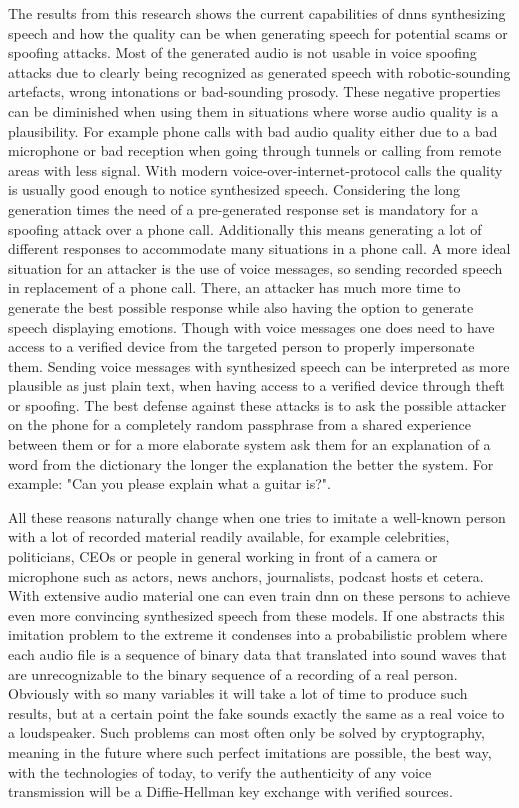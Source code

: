 The results from this research shows the current capabilities of \gls{dnn}s synthesizing speech and how the quality can be when generating speech for potential scams or spoofing attacks. Most of the generated audio is not usable in voice spoofing attacks due to clearly being recognized as generated speech with robotic-sounding artefacts, wrong intonations or bad-sounding prosody. These negative properties can be diminished when using them in situations where worse audio quality is a plausibility. For example phone calls with bad audio quality either due to a bad microphone or bad reception when going through tunnels or calling from remote areas with less signal. With modern voice-over-internet-protocol calls the quality is usually good enough to notice synthesized speech. Considering the long generation times the need of a pre-generated response set is mandatory for a spoofing attack over a phone call. Additionally this means generating a lot of different responses to accommodate many situations in a phone call. A more ideal situation for an attacker is the use of voice messages, so sending recorded speech in replacement of a phone call. There, an attacker has much more time to generate the best possible response while also having the option to generate speech displaying emotions. Though with voice messages one does need to have access to a verified device from the targeted person to properly impersonate them. Sending voice messages with synthesized speech can be interpreted as more plausible as just plain text, when having access to a verified device through theft or spoofing. The best defense against these attacks is to ask the possible attacker on the phone for a completely random passphrase from a shared experience between them or for a more elaborate system ask them for an explanation of a word from the dictionary the longer the explanation the better the system. For example: "Can you please explain what a guitar is?".

All these reasons naturally change when one tries to imitate a well-known person with a lot of recorded material readily available, for example celebrities, politicians, CEOs or people in general working in front of a camera or microphone such as actors, news anchors, journalists, podcast hosts et cetera. With extensive audio material one can even train \gls{dnn} on these persons to achieve even more convincing synthesized speech from these models. If one abstracts this imitation problem to the extreme it condenses into a probabilistic problem where each audio file is a sequence of binary data that translated into sound waves that are unrecognizable to the binary sequence of a recording of a real person. Obviously with so many variables it will take a lot of time to produce such results, but at a certain point the fake sounds exactly the same as a real voice to a loudspeaker. Such problems can most often only be solved by cryptography, meaning in the future where such perfect imitations are possible, the best way, with the technologies of today, to verify the authenticity of any voice transmission will be a Diffie-Hellman key exchange with verified sources\cite{maurer2000diffie}.